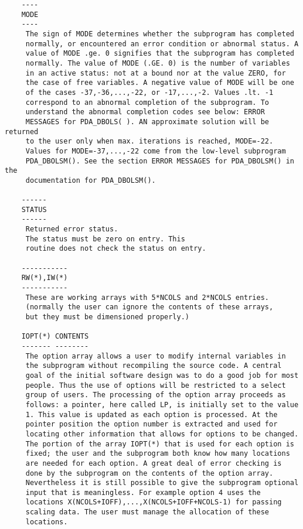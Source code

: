 \begin{verbatim}
    ----
    MODE
    ----
     The sign of MODE determines whether the subprogram has completed
     normally, or encountered an error condition or abnormal status. A
     value of MODE .ge. 0 signifies that the subprogram has completed
     normally. The value of MODE (.GE. 0) is the number of variables
     in an active status: not at a bound nor at the value ZERO, for
     the case of free variables. A negative value of MODE will be one
     of the cases -37,-36,...,-22, or -17,...,-2. Values .lt. -1
     correspond to an abnormal completion of the subprogram. To
     understand the abnormal completion codes see below: ERROR
     MESSAGES for PDA_DBOLS( ). AN approximate solution will be returned
     to the user only when max. iterations is reached, MODE=-22.
     Values for MODE=-37,...,-22 come from the low-level subprogram
     PDA_DBOLSM(). See the section ERROR MESSAGES for PDA_DBOLSM() in the
     documentation for PDA_DBOLSM().

    ------
    STATUS
    ------
     Returned error status.
     The status must be zero on entry. This
     routine does not check the status on entry.

    -----------
    RW(*),IW(*)
    -----------
     These are working arrays with 5*NCOLS and 2*NCOLS entries.
     (normally the user can ignore the contents of these arrays,
     but they must be dimensioned properly.)

    IOPT(*) CONTENTS
    ------- --------
     The option array allows a user to modify internal variables in
     the subprogram without recompiling the source code. A central
     goal of the initial software design was to do a good job for most
     people. Thus the use of options will be restricted to a select
     group of users. The processing of the option array proceeds as
     follows: a pointer, here called LP, is initially set to the value
     1. This value is updated as each option is processed. At the
     pointer position the option number is extracted and used for
     locating other information that allows for options to be changed.
     The portion of the array IOPT(*) that is used for each option is
     fixed; the user and the subprogram both know how many locations
     are needed for each option. A great deal of error checking is
     done by the subprogram on the contents of the option array.
     Nevertheless it is still possible to give the subprogram optional
     input that is meaningless. For example option 4 uses the
     locations X(NCOLS+IOFF),...,X(NCOLS+IOFF+NCOLS-1) for passing
     scaling data. The user must manage the allocation of these
     locations.


\end{verbatim}
